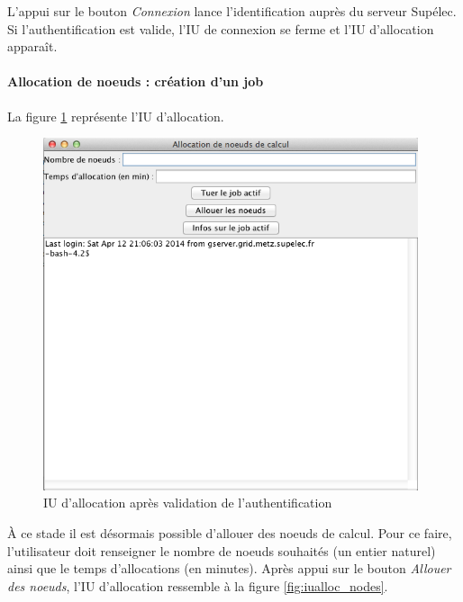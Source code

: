 \par L’appui sur le bouton \emph{Connexion} lance l’identification auprès du serveur Supélec. Si l'authentification est valide, l'IU de connexion se ferme et l'IU d'allocation apparaît.

\paragraph{Allocation de noeuds : création d'un job}

\par La figure \ref{fig:iualloc_launch} représente l'IU d'allocation.

\begin{figure}[h!]
  \centering
  \includegraphics[width=11cm]{images/iuallocation_launch.png}
  \caption{IU d'allocation après validation de l'authentification}
  \label{fig:iualloc_launch}
\end{figure}

\par À ce stade il est désormais possible d'allouer des noeuds de calcul. Pour ce faire, l'utilisateur doit renseigner le nombre de noeuds souhaités (un entier naturel) ainsi que le temps d'allocations (en minutes). Après appui sur le bouton \emph{Allouer des noeuds}, l'IU d'allocation ressemble à la figure \ref{fig:iualloc_nodes}.

